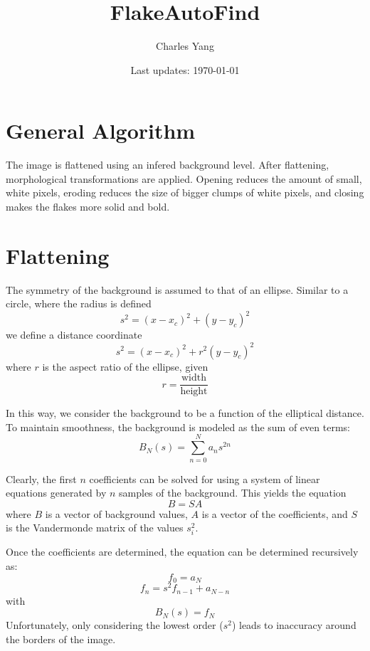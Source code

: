 \documentclass{article}
\title{FlakeAutoFind}
\author{Charles Yang}
\date{Last updates: \today}
\begin{document}
\maketitle
\setcounter{tocdepth}{1}
\tableofcontents

\section{General Algorithm}
The image is flattened using an infered background level. After flattening, morphological transformations are applied. Opening reduces the amount of small, white pixels, eroding reduces the size of bigger clumps of white pixels, and closing makes the flakes more solid and bold. 

\section{Flattening}
The symmetry of the background is assumed to that of an ellipse. Similar to a circle, where the radius is defined
\[s^2=(x-x_c)^2+(y-y_c)^2\]
we define a distance coordinate
\[s^2=(x-x_c)^2+r^2(y-y_c)^2\]
where \(r\) is the aspect ratio of the ellipse, given
\[r = \frac{\text{width}}{\text{height}}\]

In this way, we consider the background to be a function of the elliptical distance. To maintain smoothness, the background is modeled as the sum of even terms:
\[B_N(s)=\sum_{n=0}^N a_ns^{2n}\]

Clearly, the first \(n\) coefficients can be solved for using a system of linear equations generated by \(n\) samples of the background. This yields the equation
\[B = SA\]
where \(B\) is a vector of background values, \(A\) is a vector of the coefficients, and \(S\) is the Vandermonde matrix of the values \(s_i^2\).



Once the coefficients are determined, the equation can be determined recursively as:
\[f_0=a_N\]
\[f_{n} =s^2f_{n-1} +a_{N-n}\]
with
\[B_N(s)=f_N\]
Unfortunately, only considering the lowest order (\(s^2\)) leads to inaccuracy around the borders of the image. 
\end{document}
